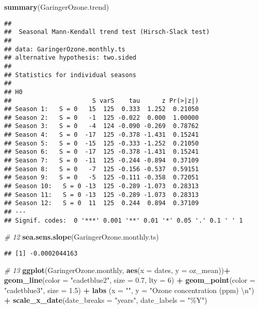 \documentclass[
]{article}
\newenvironment{Shaded}{\begin{snugshade}}{\end{snugshade}}
\newcommand{\CharTok}[1]{\textcolor[rgb]{0.31,0.60,0.02}{#1}}
\newcommand{\CommentTok}[1]{\textcolor[rgb]{0.56,0.35,0.01}{\textit{#1}}}
\newcommand{\DataTypeTok}[1]{\textcolor[rgb]{0.13,0.29,0.53}{#1}}
\newcommand{\DecValTok}[1]{\textcolor[rgb]{0.00,0.00,0.81}{#1}}
\newcommand{\FloatTok}[1]{\textcolor[rgb]{0.00,0.00,0.81}{#1}}
\newcommand{\KeywordTok}[1]{\textcolor[rgb]{0.13,0.29,0.53}{\textbf{#1}}}
\newcommand{\NormalTok}[1]{#1}
\newcommand{\OperatorTok}[1]{\textcolor[rgb]{0.81,0.36,0.00}{\textbf{#1}}}
\newcommand{\StringTok}[1]{\textcolor[rgb]{0.31,0.60,0.02}{#1}}
\begin{document}
\begin{Shaded}
\begin{Highlighting}[]
\KeywordTok{summary}\NormalTok{(GaringerOzone.trend)}
\end{Highlighting}
\end{Shaded}

\begin{verbatim}
## 
##  Seasonal Mann-Kendall trend test (Hirsch-Slack test)
## 
## data: GaringerOzone.monthly.ts
## alternative hypothesis: two.sided
## 
## Statistics for individual seasons
## 
## H0
##                      S varS    tau      z Pr(>|z|)  
## Season 1:   S = 0   15  125  0.333  1.252  0.21050  
## Season 2:   S = 0   -1  125 -0.022  0.000  1.00000  
## Season 3:   S = 0   -4  124 -0.090 -0.269  0.78762  
## Season 4:   S = 0  -17  125 -0.378 -1.431  0.15241  
## Season 5:   S = 0  -15  125 -0.333 -1.252  0.21050  
## Season 6:   S = 0  -17  125 -0.378 -1.431  0.15241  
## Season 7:   S = 0  -11  125 -0.244 -0.894  0.37109  
## Season 8:   S = 0   -7  125 -0.156 -0.537  0.59151  
## Season 9:   S = 0   -5  125 -0.111 -0.358  0.72051  
## Season 10:   S = 0 -13  125 -0.289 -1.073  0.28313  
## Season 11:   S = 0 -13  125 -0.289 -1.073  0.28313  
## Season 12:   S = 0  11  125  0.244  0.894  0.37109  
## ---
## Signif. codes:  0 '***' 0.001 '**' 0.01 '*' 0.05 '.' 0.1 ' ' 1
\end{verbatim}

\begin{Shaded}
\begin{Highlighting}[]
\CommentTok{\# 12}
\KeywordTok{sea.sens.slope}\NormalTok{(GaringerOzone.monthly.ts)}
\end{Highlighting}
\end{Shaded}

\begin{verbatim}
## [1] -0.0002044163
\end{verbatim}

\begin{Shaded}
\begin{Highlighting}[]
\CommentTok{\# 13 }
\KeywordTok{ggplot}\NormalTok{(GaringerOzone.monthly, }
                     \KeywordTok{aes}\NormalTok{(}\DataTypeTok{x =}\NormalTok{ dates, }\DataTypeTok{y =}\NormalTok{ oz\_mean))}\OperatorTok{+}\StringTok{ }
\StringTok{  }\KeywordTok{geom\_line}\NormalTok{(}\DataTypeTok{color =} \StringTok{"cadetblue2"}\NormalTok{, }\DataTypeTok{size =} \FloatTok{0.7}\NormalTok{, }\DataTypeTok{lty =} \DecValTok{6}\NormalTok{) }\OperatorTok{+}
\StringTok{  }\KeywordTok{geom\_point}\NormalTok{(}\DataTypeTok{color =} \StringTok{"cadetblue3"}\NormalTok{, }\DataTypeTok{size =} \FloatTok{1.5}\NormalTok{) }\OperatorTok{+}\StringTok{ }
\StringTok{  }\KeywordTok{labs}\NormalTok{ (}\DataTypeTok{x =} \StringTok{""}\NormalTok{, }\DataTypeTok{y =} \StringTok{"Ozone concentration (ppm) }\CharTok{\textbackslash{}n}\StringTok{"}\NormalTok{) }\OperatorTok{+}
\StringTok{  }\KeywordTok{scale\_x\_date}\NormalTok{(}\DataTypeTok{date\_breaks =} \StringTok{"years"}\NormalTok{, }\DataTypeTok{date\_labels =} \StringTok{"\%Y"}\NormalTok{)}
\end{Highlighting}
\end{Shaded}
\end{document}
